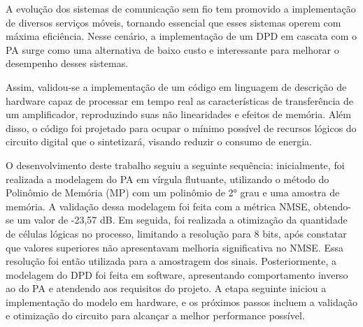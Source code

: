 A evolução dos sistemas de comunicação sem fio tem promovido a implementação de diversos serviços móveis, tornando essencial que esses sistemas operem com máxima eficiência. Nesse cenário, a implementação de um DPD em cascata com o PA surge como uma alternativa de baixo custo e interessante para melhorar o desempenho desses sistemas.

Assim, validou-se a implementação de um código em linguagem de descrição de hardware capaz de processar em tempo real as características de transferência de um amplificador, reproduzindo suas não linearidades e efeitos de memória. Além disso, o código foi projetado para ocupar o mínimo possível de recursos lógicos do circuito digital que o sintetizará, visando reduzir o consumo de energia.

O desenvolvimento deste trabalho seguiu a seguinte sequência: inicialmente, foi realizada a modelagem do PA em vírgula flutuante, utilizando o método do Polinômio de Memória (MP) com um polinômio de 2° grau e uma amostra de memória. A validação dessa modelagem foi feita com a métrica NMSE, obtendo-se um valor de -23,57 dB. Em seguida, foi realizada a otimização da quantidade de células lógicas no processo, limitando a resolução para 8 bits, após constatar que valores superiores não apresentavam melhoria significativa no NMSE. Essa resolução foi então utilizada para a amostragem dos sinais. Posteriormente, a modelagem do DPD foi feita em software, apresentando comportamento inverso ao do PA e atendendo aos requisitos do projeto. A etapa seguinte iniciou a implementação do modelo em hardware, e os próximos passos incluem a validação e otimização do circuito para alcançar a melhor performance possível.